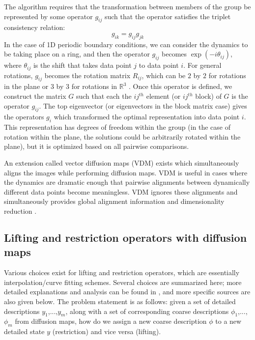 \documentclass[12pt]{article}
\begin{document}
The algorithm requires that the transformation between members of the group be represented by some operator $g_{ij}$ such that the operator satisfies the triplet consistency relation:
\[
g_{ik} = g_{ij}g_{jk}
\]
In the case of 1D periodic boundary conditions, we can consider the dynamics to be taking place on a ring, and then the operator $g_{ij}$ becomes $\exp(-i\theta_{ij})$, where $\theta_{ij}$ is the shift that takes data point $j$ to data point $i$. For general rotations, $g_{ij}$ becomes the rotation matrix $R_{ij}$, which can be $2$ by $2$ for rotations in the plane or $3$ by $3$ for rotations in $\mathbb{R}^3$ \cite{Sonday2013}. Once this operator is defined, we construct the matrix $G$ such that each the $ij^{th}$ element (or $ij^{th}$  block) of $G$ is the operator $g_{ij}$. The top eigenvector (or eigenvectors in the block matrix case) gives the operators $g_i$ which transformed the optimal representation into data point $i$. This representation has degrees of freedom within the group (in the case of rotation within the plane, the solutions could be arbitrarily rotated within the plane), but it is optimized based on all pairwise comparisons. \vspace{1mm}

An extension called vector diffusion maps (VDM) exists which simultaneously aligns the images while performing diffusion maps. VDM is useful in cases where the dynamics are dramatic enough that pairwise alignments between dynamically different data points become meaningless. VDM ignores these alignments and simultaneously provides global alignment information and dimensionality reduction \cite{Sonday2013, Dsilva}.

\subsection{Lifting and restriction operators with diffusion maps} \label{DMLR}

Various choices exist for lifting and restriction operators, which are essentially interpolation/curve fitting schemes. Several choices are summarized here; more detailed explanations and analysis can be found in \cite{Chiavazzo2014}, and more specific sources are also given below. The problem statement is as follows: given a set of detailed descriptions $y_1$,...,$y_\textit{m}$, along with a set of corresponding coarse descriptions $\phi_1$,...,$\phi_\textit{m}$ from diffusion maps, how do we assign a new coarse description $\phi$ to a new detailed state $y$ (restriction) and vice versa (lifting).
\end{document}
